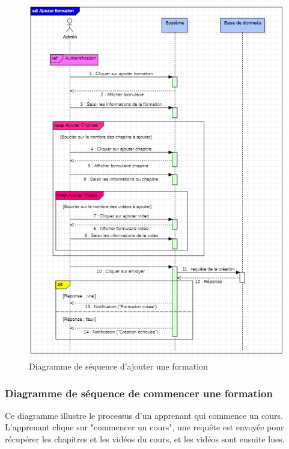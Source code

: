 \begin{figure}[H]
    \centering
    \includegraphics[width=15cm]{Figures/diagrammeDeSequenceCreerCourse.PNG}
    \caption{Diagramme de séquence d'ajouter une formation}
\end{figure}

\subsubsection{Diagramme de séquence de commencer une formation}

Ce diagramme illustre le processus d'un apprenant qui commence un cours. L'apprenant clique sur "commencer un cours", une requête est envoyée pour récupérer les chapitres et les vidéos du cours, et les vidéos sont ensuite lues.

